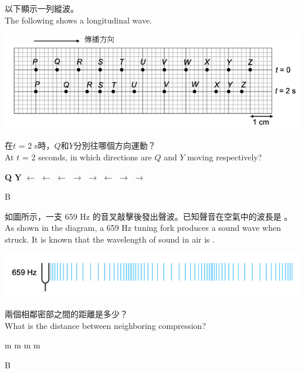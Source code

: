 {
    以下顯示一列縱波。\\The following shows a longitudinal wave.
    \par{\par\centering\includegraphics[width=.6\textwidth]{./img/ch1_earlyclass_wave_mc_2024-05-13-16-17-43.png}\par}
    在$t$ = 2 s時，$Q$和$Y$分別往哪個方向運動？\\At $t$ = 2 seconds, in which directions are $Q$ and $Y$ moving respectively?
    \begin{tasks}
        \task [] \textbf{Q} \tab\tab \textbf{Y}
        \task $\leftarrow$ \tab\tab $\leftarrow$
        \task $\leftarrow$ \tab\tab $\rightarrow$
        \task $\rightarrow$ \tab\tab $\leftarrow$
        \task $\rightarrow$ \tab\tab $\rightarrow$
    \end{tasks}
}{B}

{
    如圖所示，一支 659 Hz 的音叉敲擊後發出聲波。已知聲音在空氣中的波長是 。\\As shown in the diagram, a 659 Hz tuning fork produces a sound wave when struck. It is known that the wavelength of sound in air is .
    \par{\par\centering\includegraphics[width=.6\textwidth]{./img/ch1_earlyclass_wave_mc_2024-05-13-16-20-01.png}\par}
    兩個相鄰密部之間的距離是多少？\\What is the distance between neighboring compression?

    \begin{tasks}
         m
         m
         m
         m
    \end{tasks}

}{B}

